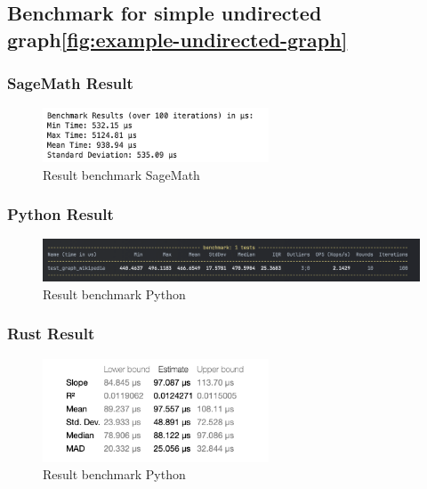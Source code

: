 \subsection{Benchmark for simple undirected graph\ref{fig:example-undirected-graph}}\label{subsec:benchmark-for-simple-undirected-graph}

\subsubsection*{SageMath Result}

\begin{figure}[!h]
    \centering
    \includegraphics[width=0.60\textwidth]{images/benchmark/graph_wikipedia/benchmark_graph_wikipedia_sagemath}
    \caption{Result benchmark SageMath}
    \label{fig:benchmark-graph-wikipedia-sagemath}
\end{figure}

\subsubsection*{Python Result}
\begin{figure}[!h]
    \centering
    \includegraphics[width=1\textwidth]{images/benchmark/graph_wikipedia/benchmark_graph_wikipedia_python}
    \caption{Result benchmark Python}
    \label{fig:benchmark-graph-wikipedia-python}
\end{figure}

\subsubsection*{Rust Result}
\begin{figure}[!h]
    \centering
    \includegraphics[width=0.60\textwidth]{images/benchmark/graph_wikipedia/benchmark_graph_wikipedia_rust}
    \caption{Result benchmark Python}
    \label{fig:benchmark-graph-wikipedia-rust}
\end{figure}


